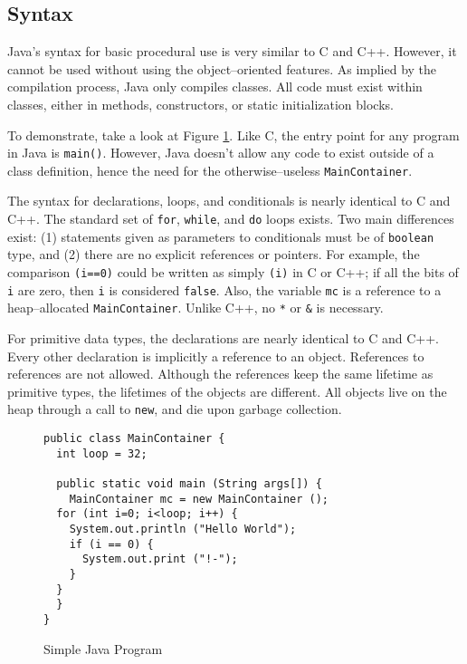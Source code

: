 
\subsection{Syntax}
  Java's syntax for basic procedural use is very similar to C and C++.  However, it cannot be used without using the object--oriented features.  As implied by the compilation process, Java only compiles classes.  All code must exist within classes, either in methods, constructors, or static initialization blocks.

	To demonstrate, take a look at Figure \ref{fig:java-simple}.  Like C, the entry point for any program in Java is \texttt{main()}.  However, Java doesn't allow any code to exist outside of a class definition, hence the need for the otherwise--useless  \texttt{MainContainer}.  

  The syntax for declarations, loops, and conditionals is nearly identical to C and C++.  The standard set of \texttt{for}, \texttt{while}, and \texttt{do} loops exists.  Two main differences exist: (1) statements given as parameters to conditionals must be of \texttt{boolean} type, and (2) there are no explicit references or pointers.  For example, the comparison \texttt{(i==0)} could be written as simply \texttt{(i)} in C or C++; if all the bits of \texttt{i} are zero, then \texttt{i} is considered \texttt{false}.  Also, the variable \texttt{mc} is a reference to a heap--allocated \texttt{MainContainer}.  Unlike C++, no \texttt{*} or \texttt{\&} is necessary.

  For primitive data types, the declarations are nearly identical to C and C++.  Every other declaration is implicitly a reference to an object.  References to references are not allowed.  Although the references keep the same lifetime as primitive types, the lifetimes of the objects are different.  All objects live on the heap through a call to \texttt{new}, and die upon garbage collection.

\begin{figure}[ht!]
\begin{verbatim}
public class MainContainer {
  int loop = 32;
  
  public static void main (String args[]) {
    MainContainer mc = new MainContainer ();
  for (int i=0; i<loop; i++) {
    System.out.println ("Hello World");
    if (i == 0) {
      System.out.print ("!-");
    }
  }
  }
}
\end{verbatim}
\caption{Simple Java Program}
\label{fig:java-simple}
\end{figure}

